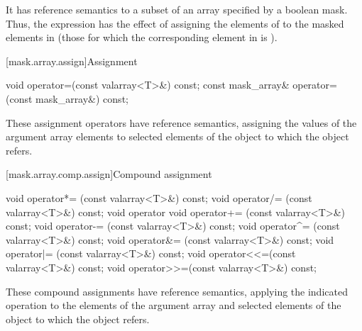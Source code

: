 \pnum
It has reference semantics to a subset of an array specified by a boolean mask.
Thus, the expression 
has the effect of assigning the elements of
 to the masked elements in 
(those for which the corresponding element in
 is ).

[mask.array.assign]{Assignment}

%
\begin{itemdecl}
void operator=(const valarray<T>&) const;
const mask_array& operator=(const mask_array&) const;
\end{itemdecl}

\begin{itemdescr}
\pnum
These assignment operators have reference semantics, assigning the values
of the argument array elements to selected elements of the
object to which the  object refers.
\end{itemdescr}

[mask.array.comp.assign]{Compound assignment}

%
%
%
%
%
%
%
%
%
%
\begin{itemdecl}
void operator*= (const valarray<T>&) const;
void operator/= (const valarray<T>&) const;
void operator%
void operator+= (const valarray<T>&) const;
void operator-= (const valarray<T>&) const;
void operator^= (const valarray<T>&) const;
void operator&= (const valarray<T>&) const;
void operator|= (const valarray<T>&) const;
void operator<<=(const valarray<T>&) const;
void operator>>=(const valarray<T>&) const;
\end{itemdecl}

\begin{itemdescr}
\pnum
These compound assignments have reference semantics, applying the
indicated operation to the elements of the argument array and selected elements
of the
object to which the  object refers.
\end{itemdescr}

